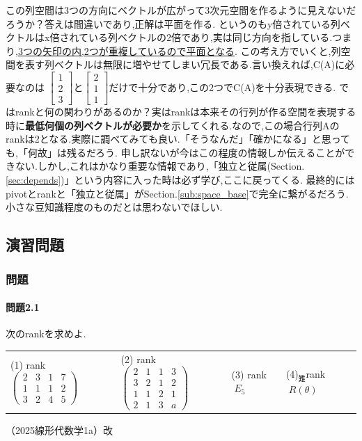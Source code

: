 この列空間は3つの方向にベクトルが広がって3次元空間を作るように見えないだろうか？答えは間違いであり,正解は平面を作る.
というのもy倍されている列ベクトルはx倍されている列ベクトルの2倍であり,実は同じ方向を指している.つまり,\underline{3つの矢印の内,2つが重複しているので平面となる}.
この考え方でいくと,列空間を表す列ベクトルは無限に増やせてしまい冗長である.言い換えれば,C(A)に必要なのは
$\begin{bmatrix}1 \\ 2\\ 3\end{bmatrix}$と$\begin{bmatrix}2 \\ 1\\ 1\end{bmatrix}$だけで十分であり,この2つでC(A)を十分表現できる.
ではrankと何の関わりがあるのか？実はrankは本来その行列が作る空間を表現する時に\textbf{最低何個の列ベクトルが必要か}を示してくれる.なので,この場合行列Aのrankは2となる.実際に調べてみても良い.「そうなんだ」「確かになる」と思っても,「何故」は残るだろう.
申し訳ないが今はこの程度の情報しか伝えることができない.しかし,これはかなり重要な情報であり,「独立と従属(Section.\ref{sec:depends})」という内容に入った時は必ず学び,ここに戻ってくる.
最終的にはpivotとrankと「独立と従属」がSection.\ref{sub:space_base}で完全に繋がるだろう.小さな豆知識程度のものだとは思わないでほしい.
\subsection{演習問題}
\subsubsection*{問題}
\paragraph{問題2.1}
次のrankを求めよ.\\
\begin{tabular}{llll}
    (1) rank
    $\begin{pmatrix}
        2 & 3 & 1 & 7 \\
        1 & 1 & 1 & 2 \\
        3 & 2 & 4 & 5
    \end{pmatrix}$ 
&(2) rank
    $\begin{pmatrix}
        2 & 1 & 1 & 3 \\
        3 & 2 & 1 & 2 \\
        1 & 1 & 2 & 1 \\
        2 & 1 & 3 & a
    \end{pmatrix}$
&(3) rank$\;E_5$
&(4)$_{\text{難}}$\;rank$\;R(\theta)$
\end{tabular}
\begin{flushright}
    （2025線形代数学1a）改
\end{flushright}
